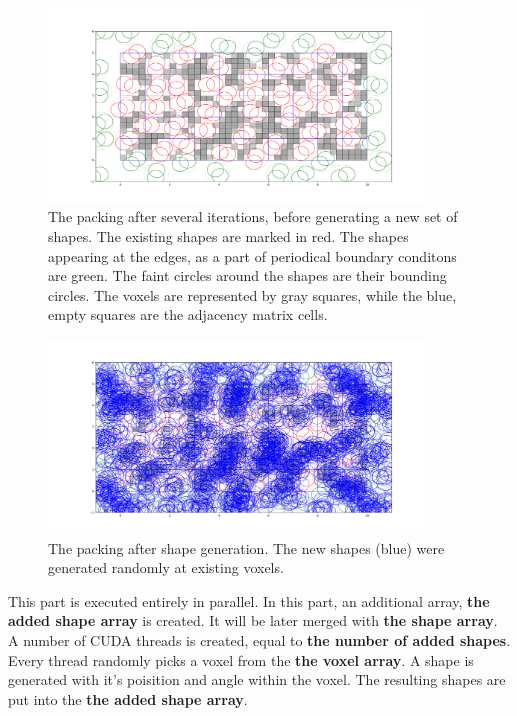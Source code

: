 \documentclass[12pt, oneside]{report}
\begin{document}
\begin{figure}[H]
  \centering
	\label{GPURSA_Process_1}
	\includegraphics[width=0.9\textwidth,keepaspectratio]{Images/GPURSA/Figure_1.pdf}
	\caption{The packing after several iterations, before generating a new set of shapes.\newline
	The existing shapes are marked in red. The shapes appearing at the edges, as a part of periodical boundary conditons are green. The faint circles around the shapes are their bounding circles. The voxels are represented by gray squares, while the blue, empty squares are the adjacency matrix cells.}
\end{figure}

\begin{figure}[H]
  \centering
	\label{GPURSA_Process_1}
	\includegraphics[width=0.9\textwidth,keepaspectratio]{Images/GPURSA/Figure_2.pdf}
	\caption{The packing after shape generation. The new shapes (blue) were generated randomly at existing voxels.}
\end{figure}

This part is executed entirely in parallel. \newline
In this part, an additional array, \textbf{the added shape array} is created. It will be later merged with \textbf{the shape array}. \newline
A number of CUDA threads is created, equal to \textbf{the number of added shapes}. Every thread randomly picks a voxel from the \textbf{the voxel array}. A shape is generated with it's poisition and angle within the voxel. The resulting shapes are put into the \textbf{the added shape array}.
\end{document}
